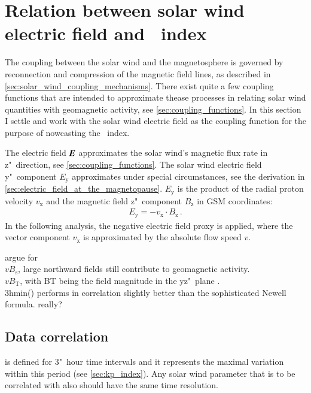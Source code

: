 \section{Relation between solar wind electric field and \Kp~index}
\label{sec:relation_between_sw_efield_and_kp}

The coupling between the solar wind and the magnetosphere is governed by reconnection and compression of the magnetic field lines, as described in \autoref{sec:solar_wind_coupling_mechanisms}. There exist quite a few coupling functions that are intended to approximate thease processes in relating solar wind quantities with geomagnetic activity, see \autoref{sec:coupling_functions}. In this section I settle and work with the solar wind electric field as the coupling function for the purpose of nowcasting the \Kp~index.

The electric field $\boldsymbol{E}$ approximates the solar wind's magnetic flux rate in z"~direction, see \autoref{sec:coupling_functions}. The solar wind electric field y"~component $E_\text{y}$ approximates under special circumstances, see the derivation in \autoref{sec:electric_field_at_the_magnetopause}. $E_\text{y}$ is the product of the radial proton velocity $v_\text{x}$ and the magnetic field z"~component $B_\text{z}$ in GSM coordinates:
\begin{align}
	E_\text{y} = -v_\text{x} \cdot B_\text{z}\,.
\end{align}
In the following analysis, the negative electric field proxy \vBz{} is applied, where the vector component $v_\text{x}$ is approximated by the absolute flow speed $v$.


argue for \vBz{}\\
$vB_\text{s}$, large northward fields still contribute to geomagnetic activity.\\
$vB_\text{T}$, with BT being the field magnitude in the yz"~plane \citep{Newell2007}.\\
3hmin(\vBz) performs in correlation slightly better than the sophisticated Newell formula. really?\\


\subsection{Data correlation}
\label{sec:data_correlation}
\Kp{} is defined for 3"~hour time intervals and it represents the maximal variation within this period (see \autoref{sec:kp_index}). Any solar wind parameter that is to be correlated with \Kp{} also should have the same time resolution.

